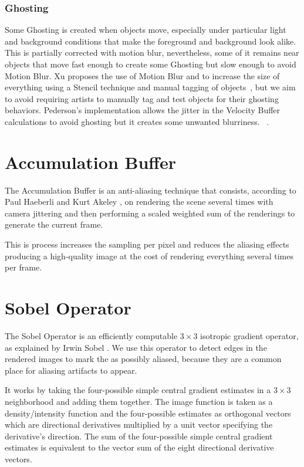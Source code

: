 \documentclass{cslthse-msc}
\begin{document}
\subsubsection{Ghosting} 
Some Ghosting is created when objects move, especially under particular light and background conditions that make the foreground and background look alike. This is partially corrected with motion blur, nevertheless, some of it remains near objects that move fast enough to create some Ghosting but slow enough to avoid Motion Blur. Xu proposes the use of Motion Blur and to increase the size of everything using a Stencil technique and manual tagging of objects~\cite{XU2016}, but we aim to avoid requiring artists to manually tag and test objects for their ghosting behaviors. Pederson's implementation allows the jitter in the Velocity Buffer calculations to avoid ghosting but it creates some unwanted blurriness. ~\cite{Fuglsand2016}.  

\section{Accumulation Buffer}
The Accumulation Buffer is an anti-aliasing technique that consists, according to Paul Haeberli and Kurt Akeley \cite{Haeberli1990}, on rendering the scene several times with camera jittering and then performing a scaled weighted sum of the renderings to generate the current frame.

This is process increases the sampling per pixel and reduces the aliasing effects producing a high-quality image at the cost of rendering everything several times per frame.

\section{Sobel Operator}
The Sobel Operator is an efficiently computable $3\times 3$ isotropic gradient operator, as explained by Irwin Sobel \cite{Sobel2014}. We use this operator to detect edges in the rendered images to mark the as possibly aliased, because they are a common place for aliasing artifacts to appear.

It works by taking the four-possible simple central gradient estimates in a $3\times 3$ neighborhood and adding them together. The image function is taken as a density/intensity function and the four-possible estimates as orthogonal vectors which are directional derivatives multiplied by a unit vector specifying the derivative’s direction.  The sum of the four-possible simple central gradient estimates is equivalent to the vector sum of the eight directional derivative vectors.
\end{document}
